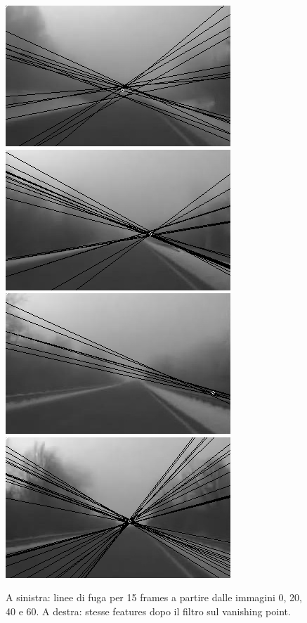 \documentclass[12pt]{report}
\begin{document}
\begin{figure}[H]
\begin{minipage}[c]{0.5\linewidth}
\end{minipage}
\begin{minipage}[c]{0.5\linewidth}
	\centering
	\includegraphics[scale=\imTrackScale]{images/aF_0000_15.png}
	\includegraphics[scale=\imTrackScale]{images/aF_0020_15.png}
	\includegraphics[scale=\imTrackScale]{images/aF_0040_15.png}
	\includegraphics[scale=\imTrackScale]{images/aF_0060_15.png}
\end{minipage}
\caption[short]{A sinistra: linee di fuga per 15 frames a partire dalle immagini 0, 20, 40 e 60. A destra: stesse features dopo il filtro sul vanishing point.}
\label{fig:vp15}
\end{figure}
\end{document}
